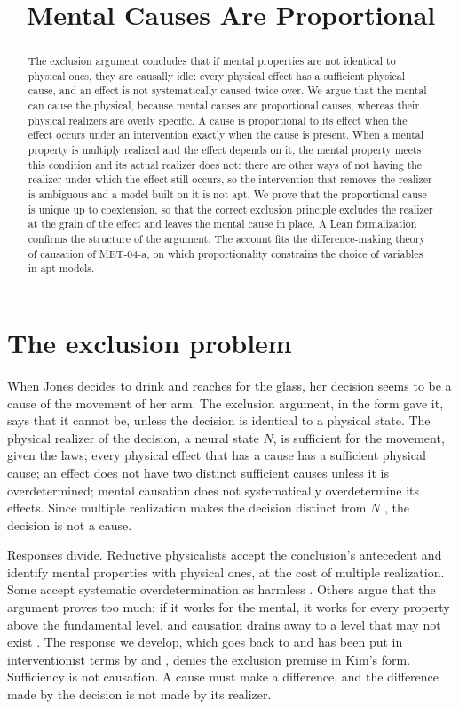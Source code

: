 \documentclass{situationist-preprint}
\title{Mental Causes Are Proportional}
\begin{document}
\maketitle

\begin{abstract}
The exclusion argument concludes that if mental properties are not identical to physical ones, they are causally idle: every physical effect has a sufficient physical cause, and an effect is not systematically caused twice over. We argue that the mental can cause the physical, because mental causes are proportional causes, whereas their physical realizers are overly specific. A cause is proportional to its effect when the effect occurs under an intervention exactly when the cause is present. When a mental property is multiply realized and the effect depends on it, the mental property meets this condition and its actual realizer does not: there are other ways of not having the realizer under which the effect still occurs, so the intervention that removes the realizer is ambiguous and a model built on it is not apt. We prove that the proportional cause is unique up to coextension, so that the correct exclusion principle excludes the realizer at the grain of the effect and leaves the mental cause in place. A Lean formalization confirms the structure of the argument. The account fits the difference-making theory of causation of MET-04-a, on which proportionality constrains the choice of variables in apt models.
\end{abstract}

\section{The exclusion problem}

When Jones decides to drink and reaches for the glass, her decision seems to be a cause of the movement of her arm. The exclusion argument, in the form \citet{Kim1998,Kim2005} gave it, says that it cannot be, unless the decision is identical to a physical state. The physical realizer of the decision, a neural state $N$, is sufficient for the movement, given the laws; every physical effect that has a cause has a sufficient physical cause; an effect does not have two distinct sufficient causes unless it is overdetermined; mental causation does not systematically overdetermine its effects. Since multiple realization makes the decision distinct from $N$ \citep{Putnam1967}, the decision is not a cause.

Responses divide. Reductive physicalists accept the conclusion's antecedent and identify mental properties with physical ones, at the cost of multiple realization. Some accept systematic overdetermination as harmless \citep{Bennett2003}. Others argue that the argument proves too much: if it works for the mental, it works for every property above the fundamental level, and causation drains away to a level that may not exist \citep{Block2003}. The response we develop, which goes back to \citet{Yablo1992} and has been put in interventionist terms by \citet{ListMenzies2009} and \citet{Woodward2008}, denies the exclusion premise in Kim's form. Sufficiency is not causation. A cause must make a difference, and the difference made by the decision is not made by its realizer.
\end{document}
